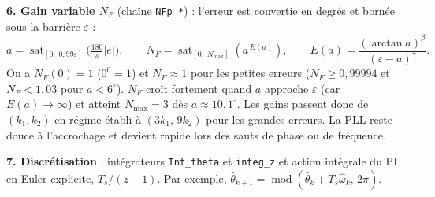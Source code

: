 \documentclass[10pt,a4paper]{article}
\newcommand{\sat}{\operatorname{sat}}
\begin{document}
\textbf{6. Gain variable $N_F$} (chaîne \texttt{NFp\_*}) : l'erreur est convertie en degrés et bornée sous la barrière $\varepsilon$ :
\begin{equation}
a=\sat_{[0,\;0{,}99\varepsilon]}\!\Big(\tfrac{180}{\pi}|e|\Big),\qquad
N_F=\sat_{[0,\;N_{\max}]}\!\left(a^{\,E(a)}\right),\qquad
E(a)=\frac{(\arctan a)^{\beta}}{(\varepsilon-a)^{\gamma}} .
\end{equation}
On a $N_F(0)=1$ ($0^0=1$) et $N_F\approx1$ pour les petites erreurs ($N_F\ge 0{,}99994$ et $N_F<1{,}03$ pour $a<6^\circ$). $N_F$ croît fortement quand $a$ approche $\varepsilon$ (car $E(a)\to\infty$) et atteint $N_{\max}=3$ dès $a\approx10{,}1^\circ$. Les gains passent donc de $(k_1,k_2)$ en régime établi à $(3k_1,\,9k_2)$ pour les grandes erreurs. La PLL reste douce à l'accrochage et devient rapide lors des sauts de phase ou de fréquence.

\textbf{7. Discrétisation} : intégrateurs \texttt{Int\_theta} et \texttt{integ\_z} et action intégrale du PI en Euler explicite, $T_s/(z-1)$. Par exemple, $\hat\theta_{k+1}=\operatorname{mod}(\hat\theta_k+T_s\hat\omega_k,\,2\pi)$.
\end{document}
